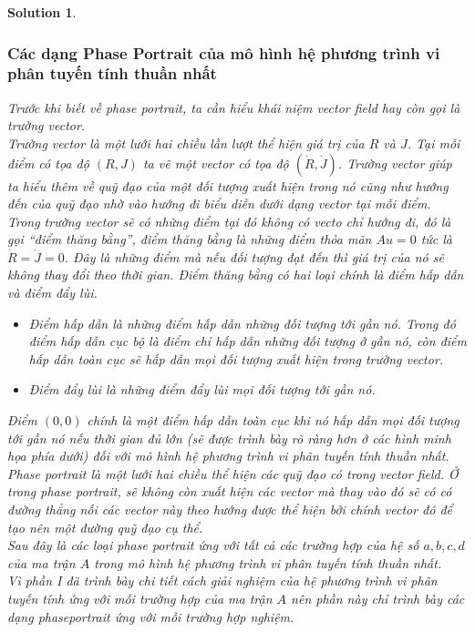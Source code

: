 \documentclass[a4paper]{article}
\newtheorem*{sol}{Solution}
\begin{document}
\begin{sol}
\subsubsection{Các dạng Phase Portrait của mô hình hệ phương trình vi phân tuyến tính thuần nhất}
Trước khi biết về phase portrait, ta cần hiểu khái niệm vector field hay còn gọi là trường vector.\\
Trường vector là một lưới hai chiều lần lượt thể hiện giá trị của $R$ và $J$. Tại mỗi điểm có tọa độ $(R,J)$ ta vẽ một vector có tọa độ $(\dot{R},\dot{J})$. Trường vector giúp ta hiểu thêm về quỹ đạo của một đối tượng xuất hiện trong nó cũng như hướng đến của quỹ đạo  nhờ vào hướng đi biểu diễn dưới dạng vector tại mỗi điểm. Trong trường vector sẽ có những điểm tại đó không có vecto chỉ hướng đi, đó là gọi “điểm thăng bằng”, điểm thăng bằng là những điểm thỏa mãn  $Au=0$ tức là $\dot{R}=\dot{J}=0$. Đây là những điểm mà nếu đối tượng đạt đến thì giá trị của nó sẽ không thay đổi theo thời gian. Điểm thăng bằng có hai loại chính là điểm hấp dẫn và điểm đẩy lùi.\\
\begin{itemize}
    \item Điểm hấp dẫn là những điểm hấp dẫn những đối tượng tới gần nó. Trong đó điểm hấp dẫn cục bộ là điểm chỉ hấp dẫn những đối tượng ở gần nó, còn điểm hấp dẫn toàn cục sẽ hấp dẫn mọi đối tượng xuất hiện trong trường vector.
    \item Điểm đẩy lùi là những điểm đẩy lùi mọi đối tượng tới gần nó.
\end{itemize}
Điểm $(0,0)$ chính là một điểm hấp dẫn toàn cục khi nó hấp dẫn mọi đối tượng tới gần nó nếu thời gian đủ lớn (sẽ được trình bày rõ ràng hơn ở các hình minh họa phía dưới) đối với mô hình hệ phương trình vi phân tuyến tính thuần nhất.\\
Phase portrait là một lưới hai chiều thể hiện các quỹ đạo có trong vector field. Ở trong phase portrait, sẽ không còn xuất hiện các vector mà thay vào đó sẽ có có đường thẳng nối các vector này theo hướng được thể hiện bởi chính vector đó để tạo nên một đường quỹ đạo cụ thể.\\
Sau đây là các loại phase portrait ứng với tất cả các trường hợp của hệ số $a,b,c,d$ của ma trận $A$ trong mô hình hệ phương trình vi phân tuyến tính thuần nhất.\\
Vì phần I đã trình bày chi tiết cách giải nghiệm của hệ phương trình vi phân tuyến tính ứng với mỗi trường hợp của ma trận $A$ nên phần này chỉ trình bày các dạng phaseportrait ứng với mỗi trường hợp nghiệm.\\

\end{sol}
\end{document}
